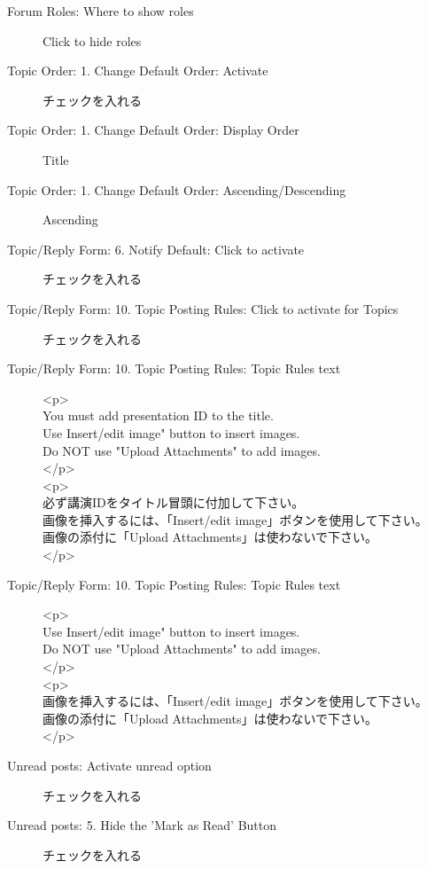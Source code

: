 \documentclass[titlepage,10pt,a4paper,uplatex]{jsbook}
\begin{document}
\begin{description}
\item[Forum Roles: Where to show roles] Click to hide roles
\item[Topic Order: 1. Change Default Order: Activate] チェックを入れる
\item[Topic Order: 1. Change Default Order: Display Order] Title
\item[Topic Order: 1. Change Default Order: Ascending/Descending] Ascending
\item[Topic/Reply Form: 6. Notify Default: Click to activate] チェックを入れる
\item[Topic/Reply Form: 10. Topic Posting Rules: Click to activate for Topics] チェックを入れる
\item[Topic/Reply Form: 10. Topic Posting Rules: Topic Rules text] {\textless}p{\textgreater}\\You must add presentation ID to the title.\\Use Insert/edit image" button to insert images.\\Do NOT use "Upload Attachments" to add images.\\{\textless}/p{\textgreater}\\{\textless}p{\textgreater}\\必ず講演IDをタイトル冒頭に付加して下さい。\\画像を挿入するには、「Insert/edit image」ボタンを使用して下さい。\\画像の添付に「Upload Attachments」は使わないで下さい。\\{\textless}/p{\textgreater}
\item[Topic/Reply Form: 10. Topic Posting Rules: Topic Rules text] {\textless}p{\textgreater}\\Use Insert/edit image" button to insert images.\\Do NOT use "Upload Attachments" to add images.\\{\textless}/p{\textgreater}\\{\textless}p{\textgreater}\\画像を挿入するには、「Insert/edit image」ボタンを使用して下さい。\\画像の添付に「Upload Attachments」は使わないで下さい。\\{\textless}/p{\textgreater}
\item[Unread posts: Activate unread option] チェックを入れる
\item[Unread posts: 5. Hide the 'Mark as Read' Button] チェックを入れる
\end{description}
\end{document}

